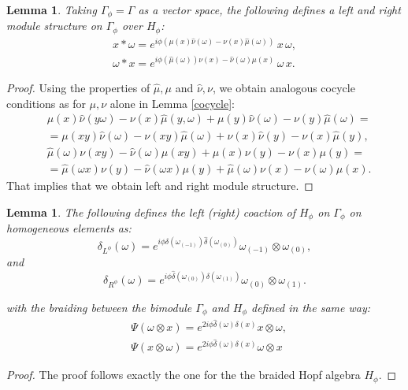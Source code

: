 \documentclass[12pt]{amsart}
\newtheorem{lem}[thm]{Lemma}
\theoremstyle{definition}
\numberwithin{equation}{section}
\newcommand{\ox}{\otimes}           %
\begin{document}
\begin{lem}\label{bimodb}
Taking  $\Gamma_\phi=\Gamma$ as a vector space, the following defines 
a left and right module structure on $\Gamma_\phi$ over $H_\phi$:
$$ 
\begin{aligned}
x \ast \omega = e^{i\phi  ( \mu(x) \hat{\nu}(\omega) - \nu(x) \hat{\mu}(\omega))} \, x \, \omega, \\
\omega \ast x  = e^{i\phi  ( \hat{\mu}(\omega)) \nu(x) - \hat{\nu}(\omega) \mu(x) } \, \omega \, x.
\end{aligned}
$$
\end{lem}
\begin{proof}
Using the properties of $\hat{\mu},\mu$ and $\hat{\nu},\nu$, we obtain
analogous cocycle conditions as for $\mu,\nu$ alone in Lemma \ref{cocycle}:
$$
\begin{aligned}
& \mu(x)\hat{\nu}(y\omega)-\nu(x)\hat{\mu}(y,\omega)+\mu(y)\hat{\nu}(\omega)-\nu(y)\hat{\mu}(\omega)=\\
&=\mu(xy)\hat{\nu}(\omega)-\nu(xy)\hat{\mu}(\omega)+\nu(x)\hat{\nu}(y)-\nu(x)\hat{\mu}(y), \\
& \hat{\mu}(\omega)\nu(xy)-\hat{\nu}(\omega)\mu(xy)+\mu(x)\nu(y)-\nu(x)\mu(y) =\\
& =\hat{\mu}(\omega x)\nu(y)-\hat{\nu}(\omega x)\mu(y)+\hat{\mu}(\omega)\nu(x)-\hat{\nu}(\omega)\mu(x).
\end{aligned}
$$
That implies that we obtain left and right module structure.
\end{proof}
\begin{lem}\label{bibim}
The following defines the left (right) coaction of $H_\phi$ on $\Gamma_\phi$ on 
homogeneous elements as:
$$ \delta_{L^\phi}(\omega)=  e^{i\phi {\delta}(\omega_{(-1)})\hat{\delta}(\omega_{(0)})}  
\omega_{(-1)} \ox \omega_{(0)},$$ 
and
$$ \delta_{R^\phi}(\omega)=  e^{i\phi  \hat{\delta}(\omega_{(0)})\delta(\omega_{(1)})}  
\omega_{(0)} \ox \omega_{(1)}.$$ 

with the braiding between the bimodule $\Gamma_\phi$ and $H_\phi$ defined in the
same way:
$$ 
\begin{aligned}
&\Psi(\omega \ox x) = e^{2 i\phi  \hat{\delta}(\omega)\delta(x)}  x \ox \omega, \\
&\Psi(x \ox \omega) = e^{2 i\phi  \hat{\delta}(\omega)\delta(x)}  \omega \ox x 
\end{aligned}
$$
\end{lem}

\begin{proof}
The proof follows exactly the one for the the braided Hopf algebra $H_\phi$.
\end{proof}
\end{document}
